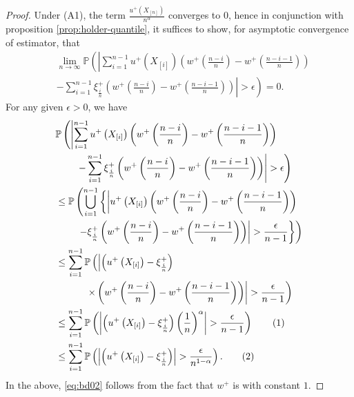 \begin{proof}
Under (A1), the term $\frac{u^+\left(X_{[n]}\right)}{n^\alpha}$ converges to 0,
hence in conjunction with proposition \ref{prop:holder-quantile}, it suffices to show, for asymptotic convergence of estimator, that
\begin{align*}
& \lim_{n\rightarrow \infty} \mathbb{P} \left( \left| \sum_{i=1}^{n-1} u^+\left(X_{[i]}\right) \left(w^+\left(\frac{n-i}{n} \right)  - w^+\left(\frac{n-i-1}{n} \right) \right) \right.\right. \\
&\left.\left.-\sum_{i=1}^{n-1} \xi^+_{\frac{i}{n}} \left(w^+\left(\frac{n-i}{n} \right)  - w^+\left(\frac{n-i-1}{n} \right) \right)\right| >
\epsilon \right)=0.
\end{align*}
For any given $\epsilon>0$, we have 
\begin{align*}
& \mathbb{P} \left( \left| \sum_{i=1}^{n-1} u^+\left(X_{[i]}\right)  \left(w^+\left(\frac{n-i}{n} \right)  - w^+\left(\frac{n-i-1}{n} \right) \right) \right.\right. \\
&\qquad\left.\left.-\sum_{i=1}^{n-1} \xi^+_{\frac{i}{n}}  \left(w^+\left(\frac{n-i}{n} \right)  - w^+\left(\frac{n-i-1}{n} \right) \right) \right| >
\epsilon\right) \\ 
& \leq \mathbb{P}\left( \bigcup _{i=1}^{n-1} \left\{ \left| u^+\left(X_{[i]}\right) \left(w^+\left(\frac{n-i}{n}\right) -
w^+\left(\frac{n-i-1}{n}\right)\right)\right.\right.\right.\\
&\qquad\left.\left.\left.- \xi^+_{\frac{i}{n}}  \left(w^+\left(\frac{n-i}{n} \right)  - w^+\left(\frac{n-i-1}{n} \right) \right)
\right| > \frac{\epsilon}{n-1} \right\}\right) \\ 
& \leq \sum _{i=1}^{n-1} \mathbb{P}\left( \left| \left( u^+\left(X_{[i]}\right) -
\xi^+_{\frac{i}{n}}\right)\right.\right. \\
&\quad\qquad\left.\left.\times\left(w^+\left(\frac{n-i}{n} \right)  - w^+\left(\frac{n-i-1}{n} \right) \right) \right| > \frac{\epsilon}{n-1}\right)
\\ 
& \leq \sum _{i=1}^{n-1} \Prob{ \left| \left( u^+\left(X_{[i]}\right) - \xi^+_{\frac{i}{n}}\right) \left(\frac{1}{n}\right)^{\alpha}
\right| > \frac{\epsilon}{n-1}} \stepcounter{equation}\tag{\theequation}\label{eq:bd02}\\ 
& \le \sum _{i=1}^{n-1} \Prob{ \left| \left( u^+\left(X_{[i]}\right) - \xi^+_{\frac{i}{n}}\right)
\right| > \frac{\epsilon}{n^{1-\alpha}}}.\stepcounter{equation}\tag{\theequation}\label{eq:bd12}
\end{align*}
In the above, \eqref{eq:bd02} follows from the fact that $w^+$ is \holder with constant $1$.


\end{proof}
